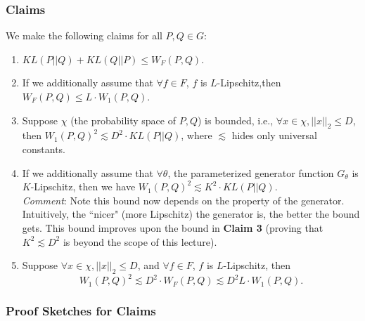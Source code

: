 \documentclass[11pt]{article}
\begin{document}
\subsubsection*{Claims}
We make the following claims for all $P,Q\in G$:
\begin{enumerate}
    \item $KL(P||Q)+KL(Q||P)\leq W_F(P,Q)$.
    
    \item If we additionally assume that $\forall f \in F$, $f$ is $L$-Lipschitz,then $W_F(P,Q) \leq L \cdot W_1(P,Q)$.
    
    \item Suppose $\chi$ (the probability space of $P, Q$) is bounded, i.e., $\forall x\in \chi ,||x||_2\leq D$, then $W_1(P,Q)^2 \lesssim D^2 \cdot KL(P||Q)$, where $\lesssim$ hides only universal constants.

    \item If we additionally assume that $\forall \theta$, the parameterized generator function $G_\theta$ is $K$-Lipschitz, then we have $W_1(P,Q)^2 \lesssim K^2 \cdot KL(P||Q)$. \\
    \textit{Comment}: Note this bound now depends on the property of the generator. Intuitively, the ``nicer" (more Lipschitz) the generator is, the better the bound gets. This bound improves upon the bound in \textbf{Claim 3} (proving that $K^2\lesssim D^2$ is beyond the scope of this lecture).
    
    \item Suppose $\forall x\in \chi ,||x||_2\leq D$, and $\forall f \in F$, $f$ is $L$-Lipschitz, then $$W_1(P,Q)^2 \lesssim D^2  \cdot W_F(P,Q) \lesssim D^2 L  \cdot W_1(P,Q).$$
    
\end{enumerate}

\subsubsection*{Proof Sketches for Claims}
\end{document}
